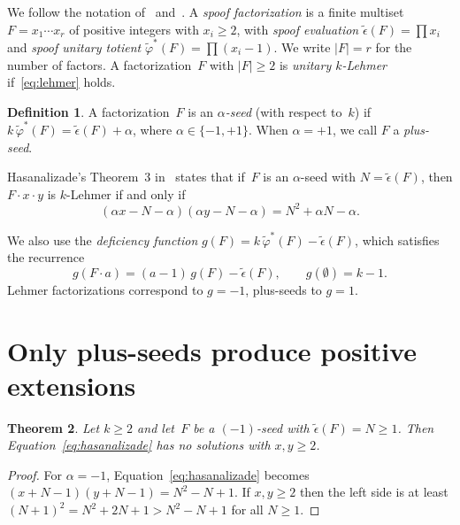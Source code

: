 \documentclass[11pt]{article}
\newtheorem{theorem}{Theorem}
\theoremstyle{definition}
\newtheorem{definition}[theorem]{Definition}
\theoremstyle{remark}
\newcommand{\eps}{\tilde{\epsilon}}
\newcommand{\phist}{\tilde{\varphi}^*}
\begin{document}
We follow the notation of~\cite{MS26} and~\cite{H26}.  A \emph{spoof
factorization} is a finite multiset $F = x_1 \cdots x_r$ of positive
integers with $x_i \ge 2$, with \emph{spoof evaluation}
$\eps(F) = \prod x_i$ and \emph{spoof unitary totient}
$\phist(F) = \prod(x_i - 1)$.  We write $|F| = r$ for the number of
factors.  A factorization~$F$ with $|F| \ge 2$ is \emph{unitary $k$-Lehmer}
if~\eqref{eq:lehmer} holds.

\begin{definition}\label{def:seed}
A factorization~$F$ is an \emph{$\alpha$-seed} (with respect to~$k$) if
$k\,\phist(F) = \eps(F) + \alpha$, where $\alpha \in \{-1, +1\}$.  When
$\alpha = +1$, we call $F$ a \emph{plus-seed}.
\end{definition}

Hasanalizade's Theorem~3 in~\cite{H26} states that if~$F$ is an
$\alpha$-seed with $N = \eps(F)$, then $F \cdot x \cdot y$ is $k$-Lehmer
if and only if
\begin{equation}\label{eq:hasanalizade}
  (\alpha x - N - \alpha)(\alpha y - N - \alpha) = N^2 + \alpha N - \alpha.
\end{equation}

We also use the \emph{deficiency function} $g(F) = k\,\phist(F) - \eps(F)$,
which satisfies the recurrence
\begin{equation}\label{eq:recurrence}
  g(F \cdot a) = (a-1)\,g(F) - \eps(F), \qquad g(\emptyset) = k - 1.
\end{equation}
Lehmer factorizations correspond to $g = -1$, plus-seeds to $g = 1$.


\section{Only plus-seeds produce positive extensions}

\begin{theorem}\label{thm:positive-only}
Let $k \ge 2$ and let~$F$ be a $(-1)$-seed with $\eps(F) = N \ge 1$.  Then
Equation~\eqref{eq:hasanalizade} has no solutions with $x, y \ge 2$.
\end{theorem}

\begin{proof}
For $\alpha = -1$, Equation~\eqref{eq:hasanalizade} becomes
$(x + N - 1)(y + N - 1) = N^2 - N + 1$.  If $x, y \ge 2$ then the left
side is at least $(N+1)^2 = N^2 + 2N + 1 > N^2 - N + 1$ for all
$N \ge 1$.
\end{proof}
\end{document}
